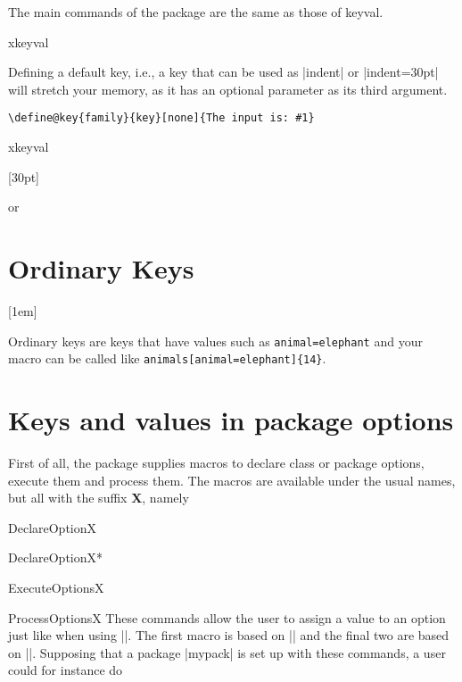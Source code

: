 The main commands of the package are the same as those of keyval. 

\begin{texexample}{xkeyval }{}
\makeatletter
{}
\makeatother
\lorem\par
{}
\lorem\par
\end{texexample}

Defining a default key, i.e., a key that can be used as |indent| or |indent=30pt| will stretch your memory, as it has an optional parameter as its third argument. 

\begin{verbatim}
\define@key{family}{key}[none]{The input is: #1}
\end{verbatim}

\begin{texexample}{xkeyval }{}
\makeatletter

[30pt]{\setlength{\parindent}{#1}}


\lorem

or 

\lorem
\makeatother
\end{texexample}

\section{Ordinary Keys}
\makeatletter
{}[1em]{\setlength{\parindent}{#1}}
\makeatother


Ordinary keys are keys that have values such as \texttt{animal=elephant} and your macro can be called like \texttt{animals[animal=elephant]\{14\}}.

   

\section{Keys and values in package options}

First of all, the package supplies macros to declare class or package options, execute them and process
them. The macros are available under the usual
\latex names, but all with the suffix \textbf{X}, namely

\begin{docCommand}{DeclareOptionX}{}
\begin{docCommand}{DeclareOptionX*}{}
\begin{docCommand}{ExecuteOptionsX}{}
\begin{docCommand}{ProcessOptionsX}{}
These commands allow the user to assign a value to
an option just like when using |\setkeys|. The first
macro is based on || and the final two
are based on |\setkeys|. Supposing that a package
|mypack| is set up with these commands, a user could
for instance do
\end{docCommand}
\end{docCommand}
\end{docCommand}
\end{docCommand}

